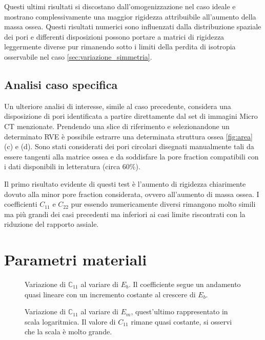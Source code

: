 \documentclass[a4paper,num-refs]{oup-contemporary}
\begin{document}
Questi ultimi risultati si discostano dall'omogenizzazione nel caso ideale e mostrano complessivamente una maggior rigidezza attribuibile all'aumento della massa ossea. Questi risultati numerici sono influenzati dalla distribuzione spaziale dei pori e differenti disposizioni possono portare a matrici di rigidezza leggermente diverse pur rimanendo sotto i limiti della perdita di isotropia osservabile nel caso \cref{sec:variazione_simmetria}.


\subsection{Analisi caso specifica}
\label{sec:caso_spec}
Un ulteriore analisi di interesse, simile al caso precedente, considera una disposizione di pori identificata a partire direttamente dal set di immagini Micro CT menzionate. Prendendo una slice di riferimento e selezionandone un determinato RVE è possibile estrarre una determinata struttura ossea \cref{fig:area} (c) e (d). Sono stati considerati dei pori circolari disegnati manualmente tali da essere tangenti alla matrice ossea e da soddisfare la pore fraction compatibili con i dati disponibili in letteratura (circa 60\%). 

Il primo risultato evidente di questi test è l'aumento di rigidezza chiarimente dovuto alla minor pore fraction considerata, ovvero all'aumento di massa ossea.  I coefficienti $C_{11}$ e $C_{22}$ pur essendo numericamente diversi rimangono molto simili ma più grandi dei casi precedenti ma inferiori ai casi limite riscontrati con la riduzione del rapporto assiale.

\section{Parametri materiali}
\label{sec:variazioni_materiali}

\begin{figure}[bt!] %
	\centering
	\def\svgwidth{0.9\linewidth}
	
	\caption{Variazione di $\mathbb C_{11}$ al variare di $E_b$. Il coefficiente segue un andamento quasi lineare con un incremento costante al crescere di $E_b$.}\label{fig:var_Ebone}
\end{figure}

\begin{figure}[bt!] %
	\centering
	\def\svgwidth{0.9\linewidth}
	
	\caption{Variazione di $\mathbb C_{11}$ al variare di $E_m$, quest'ultimo rappresentato in scala logaritmica. Il valore di $C_{11}$ rimane quasi costante, si osservi che la scala è molto grande.}\label{fig:var_Emarrow}
\end{figure}
\end{document}
